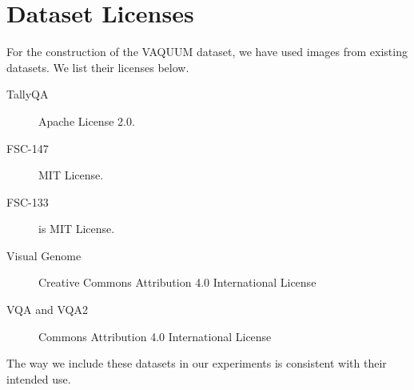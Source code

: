 \section{Dataset Licenses}
For the construction of the VAQUUM dataset, we have used images from existing datasets. We list their licenses below.

\begin{description}
    \item[TallyQA] Apache License 2.0.
    \item[FSC-147] MIT License.
    \item[FSC-133] is MIT License.
    \item[Visual Genome] Creative Commons Attribution 4.0 International License
    \item[VQA and VQA2] Commons Attribution 4.0 International License
\end{description}

\noindent The way we include these datasets in our experiments is consistent with their intended use.